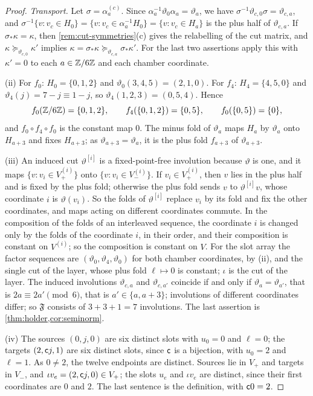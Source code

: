 \begin{proof}
\emph{Transport.} Let $\sigma=\alpha_a^{(c)}$. Since
$\alpha_a^{-1}\vartheta_0\alpha_a=\vartheta_a$, we have
$\sigma^{-1}\vartheta_{c,0}\sigma=\vartheta_{c,a}$, and
$\sigma^{-1}\{v:v_c\in H_0\}=\{v:v_c\in\alpha_a^{-1}H_0\}=\{v:v_c\in H_a\}$ is
the plus half of $\vartheta_{c,a}$. If $\sigma_*\kappa=\kappa$, then
\cref{rem:cut-symmetries}(c) gives the relabelling of the cut matrix, and
$\kappa\succeq_{\vartheta_{c,0}}\kappa'$ implies
$\kappa=\sigma_*\kappa\succeq_{\vartheta_{c,a}}\sigma_*\kappa'$. For the last
two assertions apply this with $\kappa'=0$ to each $a\in\mathbb Z/6\mathbb Z$ and each chamber
coordinate.

(ii) For $f_0$: $H_0=\{0,1,2\}$ and $\vartheta_0(3,4,5)=(2,1,0)$. For $f_4$:
$H_4=\{4,5,0\}$ and $\vartheta_4(j)=7-j\equiv1-j$, so $\vartheta_4(1,2,3)=(0,5,4)$.
Hence
\[
 f_0(\mathbb Z/6\mathbb Z)=\{0,1,2\},\qquad f_4(\{0,1,2\})=\{0,5\},\qquad f_0(\{0,5\})=\{0\},
\]
and $f_0\circ f_4\circ f_0$ is the constant map $0$. The minus fold of
$\vartheta_a$ maps $H_a$ by $\vartheta_a$ onto $H_{a+3}$ and fixes $H_{a+3}$; as
$\vartheta_{a+3}=\vartheta_a$, it is the plus fold $f_{a+3}$ of $\vartheta_{a+3}$.

(iii) An induced cut $\vartheta^{[i]}$ is a fixed-point-free involution because
$\vartheta$ is one, and it maps $\{v:v_i\in V^{(i)}_+\}$ onto
$\{v:v_i\in V^{(i)}_-\}$. If $v_i\in V^{(i)}_+$, then $v$ lies in the plus half
and is fixed by the plus fold; otherwise the plus fold sends $v$ to
$\vartheta^{[i]}v$, whose coordinate $i$ is $\vartheta(v_i)$. So the folds of
$\vartheta^{[i]}$ replace $v_i$ by its fold and fix the other coordinates, and
maps acting on different coordinates commute. In the composition of the folds
of an interleaved sequence, the coordinate $i$ is changed only by the folds of
the coordinate $i$, in their order, and their composition is constant on
$V^{(i)}$; so the composition is constant on $V$. For the slot array the factor
sequences are $(\vartheta_0,\vartheta_4,\vartheta_0)$ for both chamber
coordinates, by (ii), and the single cut of the layer, whose plus fold
$\ell\mapsto0$ is constant; $\iota$ is the cut of the layer. The induced
involutions $\vartheta_{c,a}$ and $\vartheta_{c,a'}$ coincide if and only if
$\vartheta_a=\vartheta_{a'}$, that is $2a\equiv2a'\pmod6$, that is
$a'\in\{a,a+3\}$; involutions of different coordinates differ; so $\mathfrak F$
consists of $3+3+1=7$ involutions. The last assertion is
\cref{thm:holder,cor:seminorm}.

(iv) The sources $(0,j,0)$ are six distinct slots with $u_0=0$ and $\ell=0$; the
targets $(2,\mathsf c j,1)$ are six distinct slots, since $\mathsf c$ is a bijection, with
$u_0=2$ and $\ell=1$. As $0\ne2$, the twelve endpoints are distinct. Sources lie
in $V_+$ and targets in $V_-$, and $\iota v_e=(2,\mathsf c j,0)\in V_+$; the slots
$u_e$ and $\iota v_e$ are distinct, since their first coordinates are $0$ and
$2$. The last sentence is the definition, with $\mathsf c0=2$.


\end{proof}
